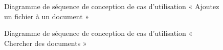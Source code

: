 \begin{figure}[H]
  \centering
  \caption{Diagramme de séquence de conception de cas d'utilisation « Ajoutez un fichier à un document »}
  \label{fig:sequence_conception_addFile}
\end{figure}
\begin{figure}[H]
  \centering
  \caption{Diagramme de séquence de conception de cas d'utilisation « Chercher des documents »}
  \label{fig:sequence_conception_charcherDocument}
\end{figure}

